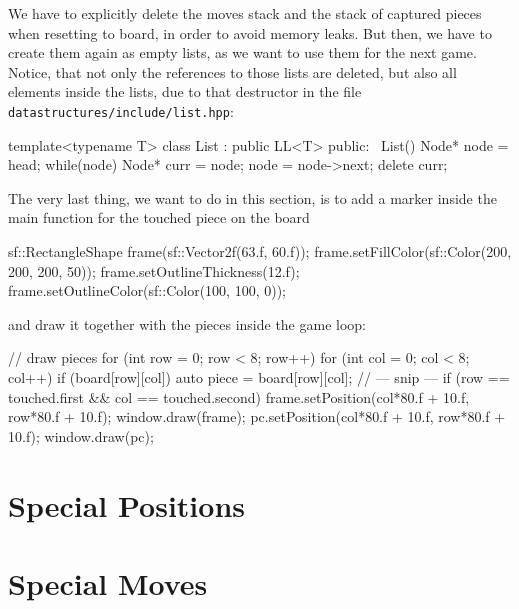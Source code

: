 We have to explicitly delete the moves stack and the stack of captured pieces when resetting to board,
in order to avoid memory leaks.
But then, we have to create them again as empty lists, as we want to use them for the next game.
Notice, that not only the references to those lists are deleted, but also all elements inside the lists,
due to that destructor in the file \texttt{datastructures/include/list.hpp}:

\begin{cpp}
template<typename T>
class List : public LL<T> {
public:
  ~List() {
    Node* node = head;
    while(node) {
      Node* curr = node;
      node = node->next;
      delete curr;
    }
  }
}
\end{cpp}

The very last thing, we want to do in this section, is to add a marker inside the main function for the
touched piece on the board

\begin{cpp}
sf::RectangleShape frame(sf::Vector2f(63.f, 60.f));
frame.setFillColor(sf::Color(200, 200, 200, 50));
frame.setOutlineThickness(12.f);
frame.setOutlineColor(sf::Color(100, 100, 0));
\end{cpp}

and draw it together with the pieces inside the game loop:

\begin{cpp}
// draw pieces
for (int row = 0; row < 8; row++) {
  for (int col = 0; col < 8; col++) {
    if (board[row][col]) {
      auto piece = board[row][col];
      // --- snip ---
      if (row == touched.first && col == touched.second) {
        frame.setPosition(col*80.f + 10.f, row*80.f + 10.f);
        window.draw(frame);
      }
      pc.setPosition(col*80.f + 10.f, row*80.f + 10.f);
      window.draw(pc);
    }
  }
}
\end{cpp}

\section{Special Positions}\label{sec:specpos}

\section{Special Moves}\label{sec:specmoves}
